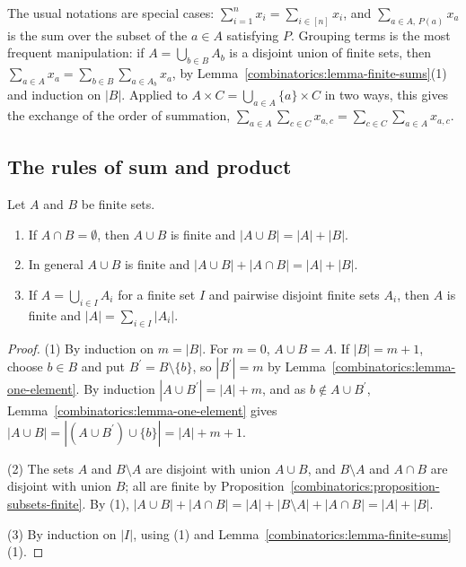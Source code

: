 \begin{remark}\label{combinatorics:remark-sum-notation}
The usual notations are special cases: $\sum_{i=1}^{n}x_i = \sum_{i \in [n]}x_i$, and $\sum_{a \in A, \, P(a)}x_a$ is the sum over the subset of the $a \in A$ satisfying $P$. Grouping terms is
the most frequent manipulation: if $A = \bigcup_{b \in B}A_b$ is a disjoint union of finite sets, then $\sum_{a \in A}x_a = \sum_{b \in B}\sum_{a \in A_b}x_a$, by
Lemma~\ref{combinatorics:lemma-finite-sums}(1) and induction on $|B|$. Applied to $A \times C = \bigcup_{a \in A}\{a\} \times C$ in two ways, this gives the exchange of the order of summation,
$\sum_{a \in A}\sum_{c \in C}x_{a,c} = \sum_{c \in C}\sum_{a \in A}x_{a,c}$.
\end{remark}

\subsection{The rules of sum and product}\label{combinatorics:subsection-sum-product}

\begin{theorem}\label{combinatorics:theorem-rule-of-sum}
Let $A$ and $B$ be finite sets.
\begin{enumerate}
\item If $A \cap B = \emptyset$, then $A \cup B$ is finite and $|A \cup B| = |A| + |B|$.
\item In general $A \cup B$ is finite and $|A \cup B| + |A \cap B| = |A| + |B|$.
\item If $A = \bigcup_{i \in I}A_i$ for a finite set $I$ and pairwise disjoint finite sets $A_i$, then $A$ is finite and $|A| = \sum_{i \in I}|A_i|$.
\end{enumerate}
\end{theorem}

\begin{proof}
(1) By induction on $m = |B|$. For $m = 0$, $A \cup B = A$. If $|B| = m + 1$, choose $b \in B$ and put $B^{\prime} = B \setminus \{b\}$, so $|B^{\prime}| = m$ by
Lemma~\ref{combinatorics:lemma-one-element}. By induction $|A \cup B^{\prime}| = |A| + m$, and as $b \notin A \cup B^{\prime}$, Lemma~\ref{combinatorics:lemma-one-element} gives
$|A \cup B| = |(A \cup B^{\prime}) \cup \{b\}| = |A| + m + 1$.

(2) The sets $A$ and $B \setminus A$ are disjoint with union $A \cup B$, and $B \setminus A$ and $A \cap B$ are disjoint with union $B$; all are finite by
Proposition~\ref{combinatorics:proposition-subsets-finite}. By (1), $|A \cup B| + |A \cap B| = |A| + |B \setminus A| + |A \cap B| = |A| + |B|$.

(3) By induction on $|I|$, using (1) and Lemma~\ref{combinatorics:lemma-finite-sums}(1).
\end{proof}

